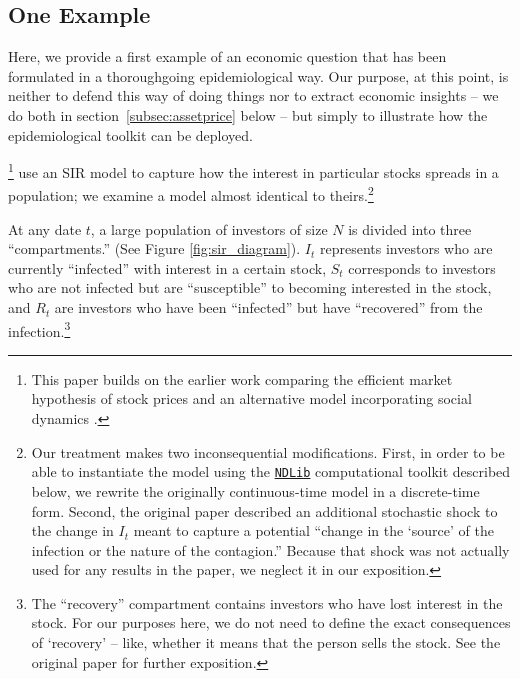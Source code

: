 
\subsection{One Example}
\label{subsec:shillerpound}

Here, we provide a first example of an economic question that has been formulated in a thoroughgoing epidemiological way.  Our purpose, at this point, is neither to defend this way of doing things nor to extract economic insights -- we do both in section~{\ref{subsec:assetprice}} below -- but simply to illustrate how the epidemiological toolkit can be deployed.

\href{https://github.com/iworld1991/EpiExp/blob/master/Literature/shiller1989survey.pdf}{\cite{shiller1989survey}}\footnote{This paper builds on the earlier work comparing the efficient market hypothesis of stock prices and an alternative model incorporating social dynamics \href{https://github.com/iworld1991/EpiExp/blob/master/Literature/shiller1984stock.pdf}{\citep{shiller1984stock}}. } use an SIR model to capture how the interest in particular stocks spreads in a population; we examine a model almost identical to theirs.\footnote{Our treatment makes two inconsequential modifications.  First, in order to be able to instantiate the model using the \href{https://ndlib.readthedocs.io/en/latest/}{\texttt{NDLib}} computational toolkit described below, we rewrite the originally continuous-time model in a discrete-time form. Second, the original paper described an additional stochastic shock to the change in $I_t$ meant to capture a potential ``change in the `source' of the infection or the nature of the contagion.''  Because that shock was not actually used for any results in the paper, we neglect it in our exposition.}


At any date  $t$, a large population of investors of size $N$ is divided into three ``compartments.''  (See Figure \ref{fig:sir_diagram}).  $I_t$ represents investors who are currently ``infected'' with interest in a certain stock,  $S_t$ corresponds to investors who are not infected but are ``susceptible'' to becoming interested in the stock, and $R_t$ are investors who have been ``infected'' but have ``recovered'' from the infection.\footnote{The ``recovery'' compartment contains investors who have lost interest in the stock.  For our purposes here, we do not need to define the exact consequences of `recovery' -- like, whether it means that the person sells the stock.  See the original paper for further exposition.}


